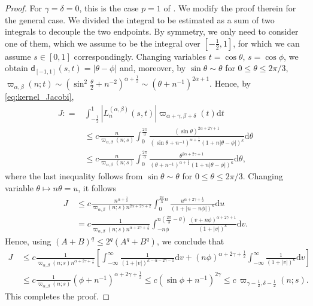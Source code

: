 \documentclass{amsart}
\theoremstyle{remark}
\def\d{\mathrm{d}}
\def\a{{\alpha}}
\def\b{{\beta}}
\def\g{{\gamma}}
\def\k{{\kappa}}
\def\t{{\theta}}
\def\d{\mathrm{d}}
\def\sd{{\mathsf d}}
\def\a{{\alpha}}
\def\b{{\beta}}
\def\g{{\gamma}}
\def\k{{\kappa}}
\def\t{{\theta}}
\def\f{\frac}
\def\f{\frac}
\begin{document}
\begin{proof}
For $\g = \delta =0$, this is the case $p = 1$ of \cite[Proposition 2.5]{PX}. We modify the proof therein for the 
general case. We divided the integral to be estimated as a sum of two integrals to decouple the two endpoints. 
By symmetry, we only need to consider one of them, which we assume to be the integral over $[-\f12,1]$, for
which we can assume $s \in [0,1]$ correspondingly. 
Changing variables $t = \cos \t$, $s = \cos \phi$, we obtain $\sd_{[-1,1]}(s,t) = | \t- \phi |$ and, moreover, by
$\sin \t \sim \t$ for $0 \le \t \le 2 \pi/3$, $\varpi_{\a,\b}(n;t) \sim (\sin^2 \f{\t}{2} + n^{-2})^{\a+\f12}\sim (\t+ n^{-1})^{2\a+1}$.
Hence, by \eqref{eq:kernel_Jacobi}, 
\begin{align*}
 J: = &  \int_{-\f12}^1 |L_n^{(\a,\b)}(s,t)| \varpi_{\a+\g,\b+\delta}(t) \d t  \\
 & \le c \frac{n}{\varpi_{\a,\b}(n;s)} \int_0^{\frac{2\pi}3} \frac{(\sin \t)^{2\a + 2\g+1}}
     {(\sin \t + n^{-1})^{\a+\f12} (1+n|\t-\phi|)^\k} \d \t \\
 & \le c \frac{n}{\varpi_{\a,\b}(n;s)} \int_0^{\frac{2\pi}3} \frac{\t^{2\a + 2\g+1}}{(\t + n^{-1})^{\a+\f12} (1+n|\t-\phi|)^\k} \d \t,
\end{align*}
where the last inequality follows from $\sin \t \sim \t$ for $0 \le \t \le 2 \pi/3$. Changing variable $\t\mapsto n \t=u$, it follows
\begin{align*}
 J \,& \le c \frac{n^{\a+\f32}}{\varpi_{\a,\b}(n;s) n^{2 \a+2\g+2}} 
    \int_0^{\frac{2\pi}3 n}\frac{u^{\a +2\g+\f12}}{  (1+|u -n \phi|)^\k} \d u \\
     & =  c \frac{1}{\varpi_{\a,\b}(n;s) n^{\a+2\g+\f12}} \int_{-n \phi}^{n (\frac{2\pi}{3}-\t)}
           \frac{(v+n \phi)^{\a + 2\g+1}}{ (1+|v|)^\k} \d v.
\end{align*}
Hence, using $(A + B)^q \le  2^q(A^q + B^q)$, we conclude that 
\begin{align*}
 J \,& \le c \frac{1}{\varpi_{\a,\b}(n;s) n^{\a+2\g+\f12}} \left[ \int_{-\infty}^\infty  \frac{1}{ (1+|v|)^{\k-\a-2\g-1}} \d v
   +  (n \phi)^{\a+ 2\g+\f12} \int_{-\infty}^\infty  \frac{1}{ (1+|v|)^\k} \d v \right] \\
    & \le  c \frac{1}{\varpi_{\a,\b}(n;s) } (\phi+n^{-1})^{\a+2\g+\f12} \le c (\sin \phi + n^{-1})^{2\g} \le c\, \varpi_{\g-\f12,\delta-\f12}(n;s).
\end{align*}
This completes the proof.
\end{proof}
\end{document}
